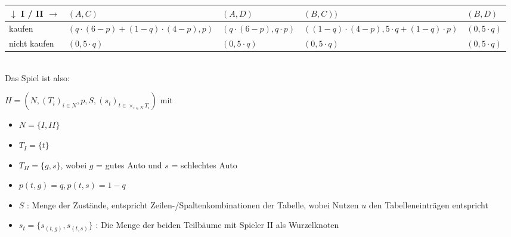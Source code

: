 \documentclass{scrartcl}
\begin{document}
\begin{tabularx}{1\textwidth} {|X|X|X|X|X|}
\hline
$\downarrow$ I / II $\rightarrow$	& $(A, C)$	& $(A, D)$	& $(B, C))$	& $(B, D)$	\\
\hline
kaufen						& $(q \cdot(6-p) + (1-q) \cdot (4-p), p)$	& $(q \cdot (6-p),
q \cdot p)$	& $((1-q) \cdot (4-p),5 \cdot q + (1-q) \cdot p)$	& $(0, 5 \cdot q)$\\
\hline
nicht kaufen	& $(0,5 \cdot q)$	& $(0,5 \cdot q)$	& $(0,5 \cdot q)$ & $(0,5 \cdot q)$\\
\hline
\end{tabularx} \\

Das Spiel ist also:

$H = (N, (T_i)_{i \in N}, p, S, (s_t)_{t \in \times_{i \in N}T_i})$ mit

\begin{itemize}
\item{$N = \{I, II\}$}
\item{$T_I = \{t\}$}
\item{$T_{II} = \{g, s\}$, wobei $g$ = gutes Auto und $s$ = schlechtes Auto}
\item{$p(t, g) = q, p(t, s) = 1 - q$}
\item{$S$ : Menge der Zustände, entspricht Zeilen-/Spaltenkombinationen der Tabelle, wobei Nutzen
$u$ den Tabelleneinträgen entspricht}
\item{$s_t = \{s_{(t, g)}, s_{(t, s)}\}$ : Die Menge der beiden Teilbäume mit Spieler II als Wurzelknoten}
\end{itemize}
\end{document}
